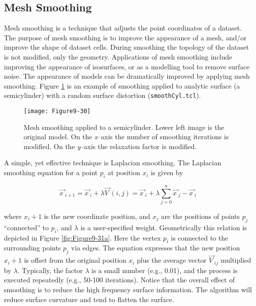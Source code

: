 \clearpage

\subsection{Mesh Smoothing}
\label{subsec:mesh_smoothing}

Mesh smoothing is a technique that adjusts the point coordinates of a dataset. The purpose of mesh smoothing is to improve the appearance of a mesh, and/or improve the shape of dataset cells. During smoothing the topology of the dataset is not modified, only the geometry. Applications of mesh smoothing include improving the appearance of isosurfaces, or as a modelling tool to remove surface noise. The appearance of models can be dramatically improved by applying mesh smoothing. Figure \ref{fig:Figure9-30} is an example of smoothing applied to analytic surface (a semicylinder) with a random surface distortion (\texttt{smoothCyl.tcl}).

\begin{figure}[!htb]
	\centering
	\texttt{[image: Figure9-30]}
	\caption{Mesh smoothing applied to a semicylinder. Lower left image is the original model. On the \emph{x}--axis the number of smoothing iterations is modified. On the  \emph{y}--axis the relaxation factor is modified.}
	\label{fig:Figure9-30}
\end{figure}

A simple, yet effective technique is Laplacian smoothing. The Laplacian smoothing equation for a point $p_i$ at position $x_i$ is given by

\begin{equation}\label{eq:9.19}
\overrightarrow{x\ }_{i+1} = \overrightarrow{x\ }_i + \lambda \overrightarrow{V\ }(i, j) = \overrightarrow{x\ }_i + \lambda \sum_{j = 0}^{n}\overrightarrow{x\ }_j - \overrightarrow{x\ }_i
\end{equation}

where $x_i + 1$ is the new coordinate position, and $x_j$ are the positions of points $p_j$ ``connected'' to $p_i$, and $\lambda$ is a user-specified weight. Geometrically this relation is depicted in Figure \ref{fig:Figure9-31a}. Here the vertex $p_i$ is connected to the surrounding points $p_j$ via edges. The equation expresses that the new position $x_i + 1$ is offset from the original position $x_i$ plus the average vector $\overrightarrow{V\ }_{ij}$ multiplied by $\lambda$. Typically, the factor $\lambda$ is a small number (e.g., 0.01), and the process is executed repeatedly (e.g., 50-100 iterations). Notice that the overall effect of smoothing is to reduce the high frequency surface information. The algorithm will reduce surface curvature and tend to flatten the surface.

